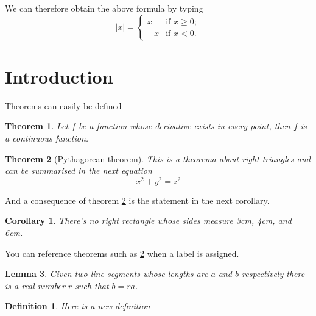             
        We can therefore obtain the above formula by typing
        \[ |x| = \left\{ \begin{array}{ll}
                 x & \mbox{if $x \geq 0$};\\
                -x & \mbox{if $x < 0$}.\end{array} \right. \]


\newtheorem{theorem}{Theorem}[section]
\newtheorem{corollary}{Corollary}[theorem]
\newtheorem{lemma}[theorem]{Lemma}
 

\section{Introduction}
Theorems can easily be defined
 
\begin{theorem}
Let $f$ be a function whose derivative exists in every point, then $f$ is 
a continuous function.
\end{theorem}
 
\begin{theorem}[Pythagorean theorem]
\label{pythagorean}
This is a theorema about right triangles and can be summarised in the next 
equation 
\[ x^2 + y^2 = z^2 \]
\end{theorem}
 
And a consequence of theorem \ref{pythagorean} is the statement in the next 
corollary.
 
\begin{corollary}
There's no right rectangle whose sides measure 3cm, 4cm, and 6cm.
\end{corollary}
 
You can reference theorems such as \ref{pythagorean} when a label is assigned.
 
\begin{lemma}
Given two line segments whose lengths are $a$ and $b$ respectively there is a 
real number $r$ such that $b=ra$.
\end{lemma}


\newtheorem{mydef}{Definition}
\begin{mydef}
Here is a new definition
\end{mydef}